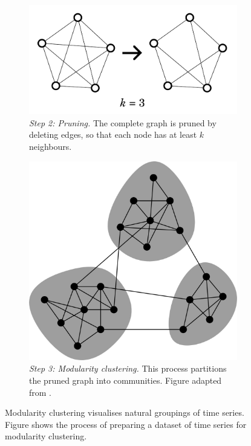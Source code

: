 \begin{figure}
  \begin{subfigure}[t]{0.45\textwidth}
  \centering
    \includegraphics[width=\linewidth]{pruning}
    \caption{
      \emph{Step 2: Pruning.}
      The complete graph is pruned by deleting edges, so that each node has at least $k$ neighbours.
    }
    \label{fig:analysis-clustering-modclust-prune}
  \end{subfigure}%
  \begin{subfigure}[t]{0.45\textwidth}
  \centering
    \includegraphics[width=\linewidth]{newmanModularityCommunityStructure2006_1}
    \caption{
      \emph{Step 3: Modularity clustering.}
      This process partitions the pruned graph into communities.
      Figure adapted from \textcite{newmanModularityCommunityStructure2006}.
    }
    \label{fig:analysis-clustering-modclust-modclust}
  \end{subfigure}

  \caption[
    Modularity clustering visualises natural groupings of time series
  ]{
    Modularity clustering visualises natural groupings of time series.
    Figure shows the process of preparing a dataset of time series for modularity clustering.
  }
  \label{fig:analysis-clustering-modclust}
\end{figure}

